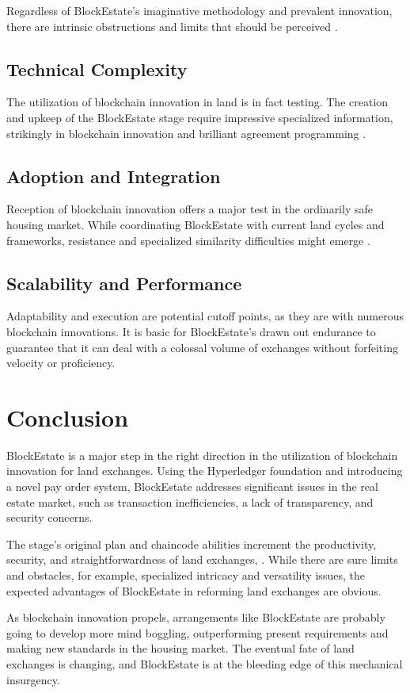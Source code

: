 \documentclass[3p,times]{elsarticle}
\begin{document}
Regardless of BlockEstate's imaginative methodology and prevalent innovation, there are intrinsic obstructions and limits that should be perceived \cite{tilbury2019business}.

\subsection{Technical Complexity}

The utilization of blockchain innovation in land is in fact testing. The creation and upkeep of the BlockEstate stage require impressive specialized information, strikingly in blockchain innovation and brilliant agreement programming \cite{jain2020blockchain}.

\subsection{Adoption and Integration}

Reception of blockchain innovation offers a major test in the ordinarily safe housing market. While coordinating BlockEstate with current land cycles and frameworks, resistance and specialized similarity difficulties might emerge \cite{yacob2021blockchain}.

\subsection{Scalability and Performance}

Adaptability and execution are potential cutoff points, as they are with numerous blockchain innovations. It is basic for BlockEstate's drawn out endurance to guarantee that it can deal with a colossal volume of exchanges without forfeiting velocity or proficiency.

\section{Conclusion}

BlockEstate is a major step in the right direction in the utilization of blockchain innovation for land exchanges. Using the Hyperledger foundation and introducing a novel pay order system, BlockEstate addresses significant issues in the real estate market, such as transaction inefficiencies, a lack of transparency, and security concerns.

The stage's original plan and chaincode abilities increment the productivity, security, and straightforwardness of land exchanges, \cite{shuaib2021improving}. While there are sure limits and obstacles, for example, specialized intricacy and versatility issues, the expected advantages of BlockEstate in reforming land exchanges are obvious.

As blockchain innovation propels, arrangements like BlockEstate are probably going to develop more mind boggling, outperforming present requirements and making new standards in the housing market. The eventual fate of land exchanges is changing, and BlockEstate is at the bleeding edge of this mechanical insurgency.



\end{document}
